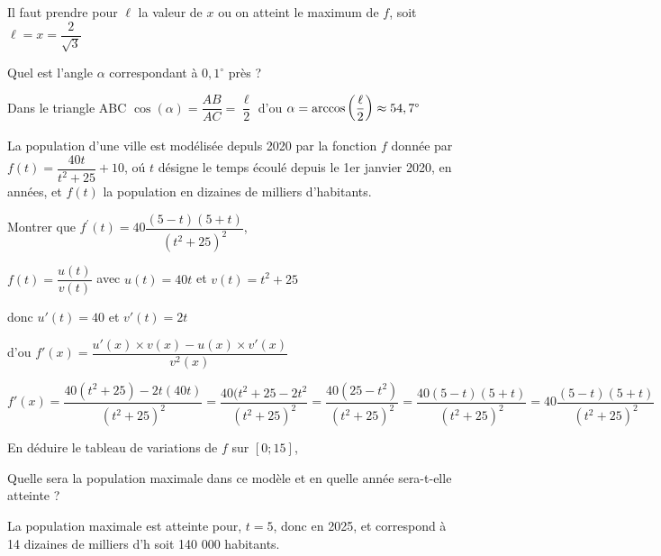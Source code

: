\documentclass[11pt,a4paper]{article}  %
\begin{document}
\begin{enumMet}
\begin{enumMet}
		\begin{corrBox}
			Il faut prendre pour $\ell$ la valeur de $x$ ou on atteint le maximum de $f$, soit $\ell =x=\dfrac{2}{\sqrt{3}}$		
		\end{corrBox}
		
		\item Quel est l'angle $\alpha$ correspondant à $0,1^{\circ}$ près ?
		\begin{corrBox}
			Dans le triangle ABC
			$\cos(\alpha)=\dfrac{AB}{AC}=\dfrac{\ell}{2}$ d'ou $\alpha=\arccos\left(\dfrac{\ell}{2}\right)\approx54,7\degree$		
		\end{corrBox}
		
	\end{enumMet}
\end{enumMet}


La population d'une ville est modélisée depuls 2020 par la fonction $f$ donnée par $f(t)=\dfrac{40 t}{t^2+25}+10$, oú $t$ désigne le temps écoulé depuis le 1er janvier 2020, en années, et $f(t)$ la population en dizaines de milliers d'habitants.
\begin{enumMet}
	\item Montrer que $f^{\prime}(t)=40 \dfrac{(5-t)(5+t)}{\left(t^2+25\right)^2}$,
	\begin{corrBox}
		$f(t)=\dfrac{u(t)}{v(t)}$ avec $u(t)=40t$ et $v(t)=t^2+25$
		
		donc $u'(t)=40$ et $v'(t)=2t$
		
		d'ou $f'(x)=\dfrac{u'(x)\times v(x)-u(x)\times v'(x)}{v^2(x)}$
		
		$f'(x)=\dfrac{40(t^2+25)-2t(40t)}{(t^2+25)^2}=\dfrac{40(t^2+25-2t^2}{(t^2+25)^2}=\dfrac{40(25-t^2)}{(t^2+25)^2}=\dfrac{40(5-t)(5+t)}{(t^2+25)^2}=40\dfrac{(5-t)(5+t)}{(t^2+25)^2}$	
	\end{corrBox}
	\item En déduire le tableau de variations de $f$ sur $[0 ; 15]$,
	\begin{corrBox}
		
	\end{corrBox}
	\item Quelle sera la population maximale dans ce modèle et en quelle année sera-t-elle atteinte ?
	\begin{corrBox}	
		La population maximale est atteinte pour, $t=5$, donc en 2025, et correspond à 14 dizaines de milliers d'h soit 140 000 habitants.		
	\end{corrBox}
\end{enumMet}
\end{document}
